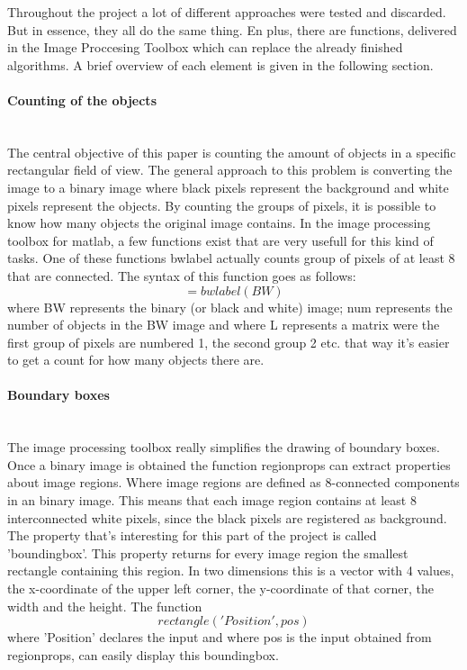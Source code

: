 \documentclass[11pt]{article}
\begin{document}
\noindent Throughout the project a lot of different approaches were tested and discarded. But in essence, they all do the same thing. En plus, there are functions, delivered in the Image Proccesing Toolbox which can replace the already finished algorithms. A brief overview of each element is given in the following section.


\paragraph{Counting of the objects}\mbox{}\\
The central objective of this paper is counting the amount of objects in a specific rectangular field of view. The general approach to this problem is converting the image to a binary image where black pixels represent the background and white pixels represent the objects. By counting the groups of pixels, it is possible to know how many objects the original image contains. In the image processing toolbox for matlab\cite{Mathworks}, a few functions exist that are very usefull for this kind of tasks. One of these functions bwlabel actually counts group of pixels of at least 8 that are connected. The syntax of this function goes as follows: 
\begin{equation}
[L, num] = bwlabel(BW)
\end{equation}
where BW represents the binary (or black and white) image; num represents the number of objects in the BW image and where L represents a matrix were the first group of pixels are numbered 1, the second group 2 etc. that way it's easier to get a count for how many objects there are.

\paragraph{Boundary boxes}\mbox{}\\
The image processing toolbox really simplifies the drawing of boundary boxes. Once a binary image is obtained the function regionprops can extract properties about image regions. Where image regions are defined as 8-connected components in an binary image. This means that each image region contains at least 8 interconnected white pixels, since the black pixels are registered as background. The property that's interesting for this part of the project is called 'boundingbox'. This property returns for every image region the smallest rectangle containing this region. In two dimensions this is a vector with 4 values, the x-coordinate of the upper left corner, the y-coordinate of that corner, the width and the height. The function 
\begin{equation}
rectangle('Position', pos)
\end{equation}
where 'Position' declares the input and where pos is the input obtained from regionprops, can easily display this boundingbox. 
\end{document}
